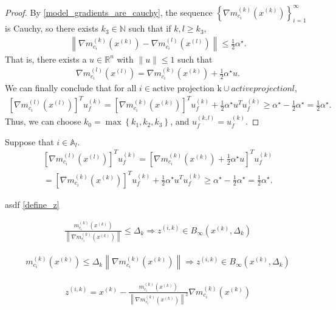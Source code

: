 \documentclass{article}
\theoremstyle{case}
\numberwithin{theorem}{subsection}
\newcommand{\activeconstraintsk}{{\mathbb A_{k}}}
\newcommand{\activeconstraintsl}{{\mathbb A_{l}}}
\newcommand{\dk}{\Delta_k}
\newcommand{\gmcik}{{\nabla m_{c_i}^{(k)}\left(\xk\right)}}
\newcommand{\gmcil}{{\nabla m_{c_i}^{(l)}\left(\xl\right)}}
\newcommand{\mcik}{{{m}^{(k)}_{c_i}}}
\newcommand{\mcil}{{{m}^{(l)}_{c_i}}}
\newcommand{\minanglealpha}{{ \alpha^{\star} }}
\newcommand{\naturals}{\mathbb N}
\newcommand{\Rn}{\mathbb R^n}
\newcommand{\tr}{{ B_{\infty}\left(\xk, \dk\right) }}
\newcommand{\xk}{x^{(k)}}
\newcommand{\xl}{{x^{(l)}}}
\newcommand{\zik}{{z^{(i, k)}}}
\newcommand{\minangledirk}{{u^{(k)}_f}}
\newcommand{\activeprojk}{{\textrm{active projection k}}}
\newcommand{\activeprojl}{{active projection l}}
\begin{document}
\begin{proof}
By \cref{model_gradients_are_cauchy}, the sequence $\left\{\gmcik\right\}_{i=1}^{\infty}$ is Cauchy,
so there exists $k_3 \in \naturals$ such that if $k, l \ge k_3$,
\begin{align*}
\left\|\nabla \mcik\left(\xk\right) - \nabla \mcil\left(\xl\right) \right\| \le \frac 1 2 \minanglealpha.
\end{align*}
That is, there exists a $u \in \Rn$ with $\|u\| \le 1$ such that 
\begin{align*}
\gmcil = \gmcik + \frac 1 2 \minanglealpha u.
\end{align*}
We can finally conclude that for all $i \in \activeprojk \cup \activeprojl$,
\begin{align*}
\left[\gmcil \right]^T \minangledirk
= \left[\gmcik\right]^T \minangledirk + \frac 1 2 \minanglealpha u^T \minangledirk
\ge \minanglealpha - \frac 1 2 \minanglealpha = \frac 1 2 \minanglealpha.
\end{align*}
Thus, we can choose $k_0 = \max\left\{k_1, k_2, k_3\right\}$, and $u_f^{(k,l)} = \minangledirk$.
\end{proof}

\color{red}



Suppose that $i \in \activeconstraintsl$.
\begin{align*}
\left[\gmcil \right]^T \minangledirk = \left[\gmcik + \frac 1 2 \minanglealpha u \right]^T \minangledirk \\
= \left[\gmcik\right]^T \minangledirk + \frac 1 2 \minanglealpha u^T \minangledirk
\ge \minanglealpha - \frac 1 2 \minanglealpha = \frac 1 2 \minanglealpha.
\end{align*}



asdf
\cref{define_z}



\begin{align*}
\frac{m^{(k)}_{c_i}(\xk)}{\left\|\gmcik\right\|} \le \dk
\Longrightarrow \zik \in \tr
\end{align*}

\begin{align*}
m^{(k)}_{c_i}(\xk) \le \dk \left\|\gmcik\right\|
\Longrightarrow \zik \in \tr
\end{align*}


\begin{align*}
\zik = \xk - \frac{m^{(k)}_{c_i}(\xk)}{\left\|\gmcik\right\|^2} \gmcik
\end{align*}
\end{document}
